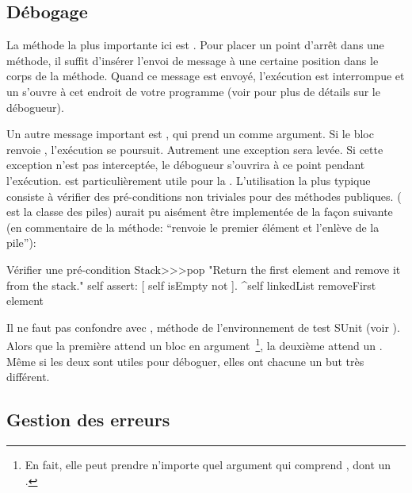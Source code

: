 \documentclass[a4paper,10pt,twoside]{book}
\begin{document}
\subsection{D\'ebogage}

La m\'ethode la plus importante ici est . Pour placer un point d'arr\^et dans une m\'ethode, il suffit d'ins\'erer l'envoi de message  \`a une certaine position dans le corps de la m\'ethode.  Quand ce message est envoy\'e, l'ex\'ecution est interrompue et un  s'ouvre \`a cet endroit de votre programme
(voir  pour plus de d\'etails sur le d\'ebogueur).


Un autre message important est , qui prend un
 comme argument. Si le bloc renvoie , l'ex\'ecution
se poursuit. Autrement une exception sera lev\'ee. Si  cette exception
n'est pas intercept\'ee, le d\'ebogueur s'ouvrira \`a ce point pendant
l'ex\'ecution.  est particuli\`erement utile pour la
. L'utilisation la plus typique
consiste \`a v\'erifier des pr\'e-conditions non triviales pour des
m\'ethodes publiques.  
( est la classe des piles)
aurait pu ais\'ement \^etre implement\'ee de la fa\c{c}on suivante
(en commentaire de la m\'ethode: ``renvoie le premier \'el\'ement et
l'enl\`eve de la pile''):

\begin{method}{V\'erifier une pr\'e-condition}
Stack>>>pop
    "Return the first element and remove it from the stack."
    self assert: [ self isEmpty not ].
    ^self linkedList removeFirst element
\end{method}

Il ne faut pas confondre  avec , m\'ethode de l'environnement de test SUnit (voir ). Alors que la premi\`ere attend un bloc en argument~\footnote{En fait, elle peut prendre n'importe quel argument qui comprend , dont un .}, la deuxi\`eme attend un . M\^eme si les deux sont utiles pour d\'eboguer, elles ont chacune un but tr\`es diff\'erent.

\subsection{Gestion des erreurs}
\end{document}
